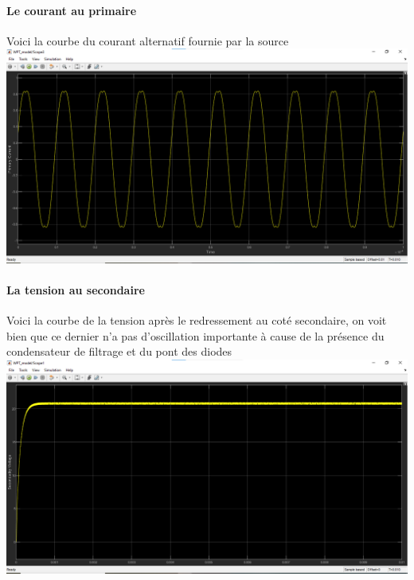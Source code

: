 \documentclass[12pt,a4paper,titlepage,notitlepage]{article}
\begin{document}
	\paragraph{Le courant au primaire\\}
	Voici la courbe du courant alternatif fournie par la source\\ 
	\includegraphics[width=1\textwidth]{WPT_simul_pc}
	\paragraph{La tension au secondaire\\}
	Voici la courbe de la tension après le redressement au coté secondaire, on voit bien que ce dernier n'a pas d'oscillation importante à cause de la présence du condensateur de filtrage et du pont des diodes\\ 
	\includegraphics[width=1\textwidth]{WPT_simul_sv}
	
\end{document}

